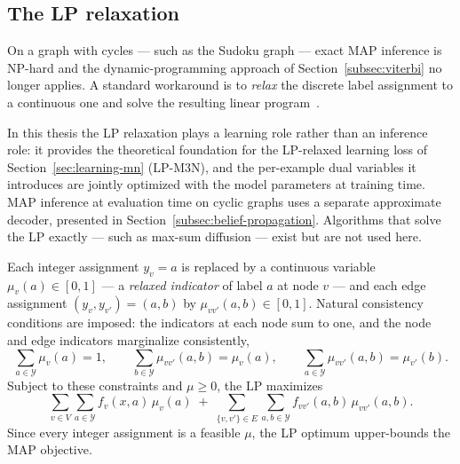 \subsection{The LP relaxation}
\label{subsec:lp-relaxation}

On a graph with cycles --- such as the Sudoku graph --- exact MAP
inference is NP-hard and the dynamic-programming approach of
Section~\ref{subsec:viterbi} no longer applies. A standard
workaround is to \emph{relax} the discrete label assignment to a
continuous one and solve the resulting linear
program~\cite{Werner2007}.

In this thesis the LP relaxation plays a learning role rather than
an inference role: it provides the theoretical foundation for the
LP-relaxed learning loss of Section~\ref{sec:learning-mn} (LP-M3N),
and the per-example dual variables it introduces are jointly
optimized with the model parameters at training time. MAP inference
at evaluation time on cyclic graphs uses a separate approximate
decoder, presented in Section~\ref{subsec:belief-propagation}.
Algorithms that solve the LP exactly --- such as max-sum diffusion
--- exist but are not used here.

Each integer assignment $y_v = a$ is replaced by a continuous variable
$\mu_v(a) \in [0, 1]$ --- a \emph{relaxed indicator} of label $a$ at
node $v$ --- and each edge assignment $(y_v, y_{v'}) = (a, b)$ by
$\mu_{vv'}(a, b) \in [0, 1]$. Natural consistency conditions are
imposed: the indicators at each node sum to one, and the node and
edge indicators marginalize consistently,
\begin{equation}
    \sum_{a \in \mathcal{Y}} \mu_v(a) = 1, \qquad
    \sum_{b \in \mathcal{Y}} \mu_{vv'}(a, b) = \mu_v(a), \qquad
    \sum_{a \in \mathcal{Y}} \mu_{vv'}(a, b) = \mu_{v'}(b).
\end{equation}
Subject to these constraints and $\mu \geq 0$, the LP maximizes
\begin{equation}
    \sum_{v \in V} \sum_{a \in \mathcal{Y}} f_v(x, a)\, \mu_v(a)
    \;+\; \sum_{\{v, v'\} \in E} \sum_{a, b \in \mathcal{Y}}
    f_{vv'}(a, b)\, \mu_{vv'}(a, b).
    \label{eq:lp-relaxation}
\end{equation}
Since every integer assignment is a feasible $\mu$, the LP optimum
upper-bounds the MAP objective.

